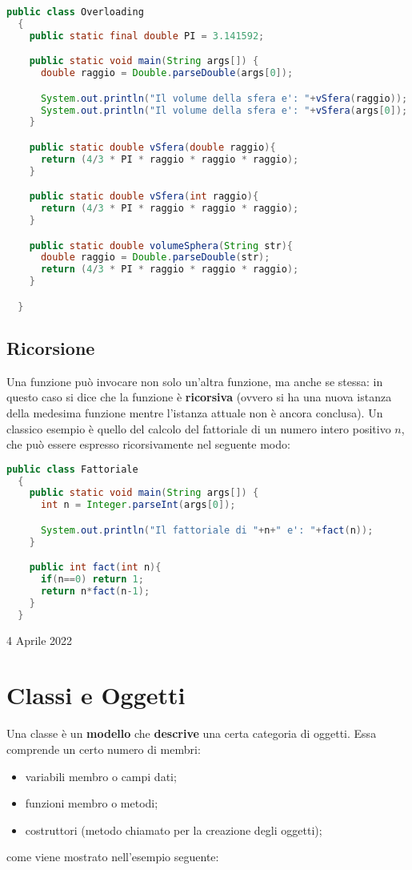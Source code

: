 \documentclass[a4paper]{extarticle}
\begin{document}
\vspace{1em}
\noindent
\begin{lstlisting}[language=Java, caption=Overloading in Java]
  public class Overloading
  {
    public static final double PI = 3.141592;

    public static void main(String args[]) {
      double raggio = Double.parseDouble(args[0]);

      System.out.println("Il volume della sfera e': "+vSfera(raggio));
      System.out.println("Il volume della sfera e': "+vSfera(args[0]);
    }

    public static double vSfera(double raggio){
      return (4/3 * PI * raggio * raggio * raggio);
    }

    public static double vSfera(int raggio){
      return (4/3 * PI * raggio * raggio * raggio);
    }

    public static double volumeSphera(String str){
      double raggio = Double.parseDouble(str);
      return (4/3 * PI * raggio * raggio * raggio);
    }

  }
\end{lstlisting}

\vspace{1em}
\subsection{Ricorsione}
Una funzione può invocare non solo un’altra funzione, ma anche se stessa: in questo caso si dice che la funzione è \textbf{ricorsiva} (ovvero si ha una nuova istanza della medesima funzione mentre l’istanza attuale non è ancora conclusa).
Un classico esempio è quello del calcolo del fattoriale di un numero intero positivo $n$, che può essere espresso ricorsivamente nel seguente modo:

\newpage
\noindent
\begin{lstlisting}[language=Java, caption=Funzione ricorsiva in Java]
  public class Fattoriale
  {
    public static void main(String args[]) {
      int n = Integer.parseInt(args[0]);

      System.out.println("Il fattoriale di "+n+" e': "+fact(n));
    }

    public int fact(int n){
      if(n==0) return 1;
      return n*fact(n-1);
    }
  }
\end{lstlisting}

\newpage
\noindent
\begin{center}
  4 Aprile 2022
\end{center}
\section{Classi e Oggetti}
Una classe è un \textbf{modello} che \textbf{descrive} una certa categoria di oggetti. Essa comprende un certo numero di membri:
\begin{itemize}
  \item variabili membro o campi dati;
  \item funzioni membro o metodi;
  \item costruttori (metodo chiamato per la creazione degli oggetti);
\end{itemize}
come viene mostrato nell'esempio seguente:
\end{document}
